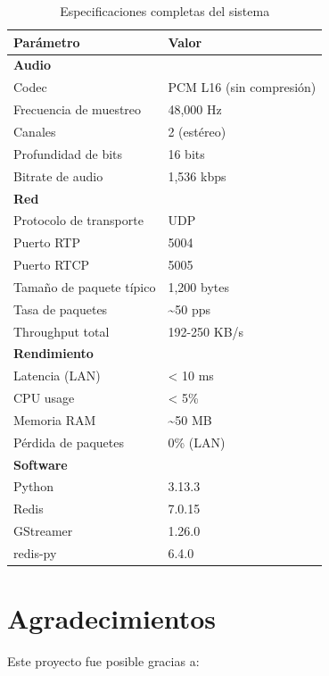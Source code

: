 \documentclass[12pt,a4paper]{article}
\begin{document}
\begin{table}[H]
\centering
\caption{Especificaciones completas del sistema}
\begin{tabular}{@{}ll@{}}
\toprule
\textbf{Parámetro} & \textbf{Valor} \\ \midrule
\multicolumn{2}{l}{\textbf{Audio}} \\
Codec & PCM L16 (sin compresión) \\
Frecuencia de muestreo & 48,000 Hz \\
Canales & 2 (estéreo) \\
Profundidad de bits & 16 bits \\
Bitrate de audio & 1,536 kbps \\
\midrule
\multicolumn{2}{l}{\textbf{Red}} \\
Protocolo de transporte & UDP \\
Puerto RTP & 5004 \\
Puerto RTCP & 5005 \\
Tamaño de paquete típico & 1,200 bytes \\
Tasa de paquetes & \textasciitilde50 pps \\
Throughput total & 192-250 KB/s \\
\midrule
\multicolumn{2}{l}{\textbf{Rendimiento}} \\
Latencia (LAN) & < 10 ms \\
CPU usage & < 5\% \\
Memoria RAM & \textasciitilde50 MB \\
Pérdida de paquetes & 0\% (LAN) \\
\midrule
\multicolumn{2}{l}{\textbf{Software}} \\
Python & 3.13.3 \\
Redis & 7.0.15 \\
GStreamer & 1.26.0 \\
redis-py & 6.4.0 \\
\bottomrule
\end{tabular}
\end{table}

\newpage

\section*{Agradecimientos}

Este proyecto fue posible gracias a:
\end{document}
